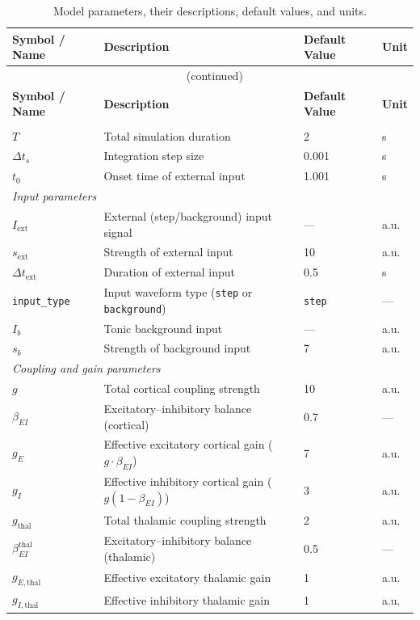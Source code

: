 \documentclass[12pt, a4paper]{article}
\begin{document}
\begin{longtable}{@{}lp{5.5cm}p{3.2cm}l@{}}
\caption{Model parameters, their descriptions, default values, and units.}
\label{tab:params}\\
\toprule
\textbf{Symbol / Name} & \textbf{Description} & \textbf{Default Value} & \textbf{Unit} \\
\midrule
\endfirsthead
\multicolumn{4}{c}{\tablename~\thetable{} (continued)}\\
\toprule
\textbf{Symbol / Name} & \textbf{Description} & \textbf{Default Value} & \textbf{Unit} \\
\midrule
\endhead
\bottomrule
\endlastfoot

\multicolumn{4}{l}{\textit{Simulation control}} \\[2pt]
$T$ & Total simulation duration & 2 & s \\
$\Delta t_s$ & Integration step size & 0.001 & s \\
$t_0$ & Onset time of external input & 1.001 & s \\[6pt]

\multicolumn{4}{l}{\textit{Input parameters}} \\[2pt]
$I_\text{ext}$ & External (step/background) input signal & --- & a.u. \\
$s_\text{ext}$ & Strength of external input & 10 & a.u. \\
$\Delta t_\text{ext}$ & Duration of external input & 0.5 & s \\
\texttt{input\_type} & Input waveform type (\texttt{step} or \texttt{background}) & \texttt{step} & --- \\
$I_b$ & Tonic background input & --- & a.u. \\
$s_b$ & Strength of background input & 7 & a.u. \\[6pt]

\multicolumn{4}{l}{\textit{Coupling and gain parameters}} \\[2pt]
$g$ & Total cortical coupling strength & 10 & a.u. \\
$\beta_{EI}$ & Excitatory--inhibitory balance (cortical) & 0.7 & --- \\
$g_E$ & Effective excitatory cortical gain ($g \cdot \beta_{EI}$) & 7 & a.u. \\
$g_I$ & Effective inhibitory cortical gain ($g(1-\beta_{EI})$) & 3 & a.u. \\
$g_\text{thal}$ & Total thalamic coupling strength & 2 & a.u. \\
$\beta_{EI}^{\text{thal}}$ & Excitatory--inhibitory balance (thalamic) & 0.5 & --- \\
$g_{E,\text{thal}}$ & Effective excitatory thalamic gain & 1 & a.u. \\
$g_{I,\text{thal}}$ & Effective inhibitory thalamic gain & 1 & a.u. \\[6pt]


\end{longtable}
\end{document}
